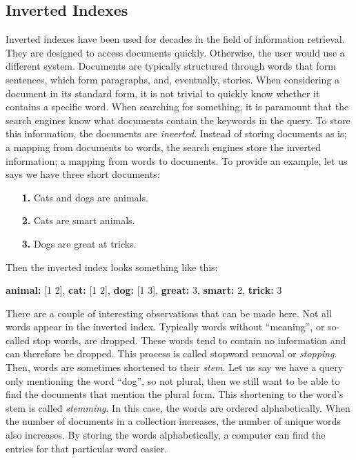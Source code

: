 \subsection{Inverted Indexes}
Inverted indexes have been used for decades in the field of information retrieval. They are designed to access documents quickly. Otherwise, the user would use a different system. Documents are typically structured through words that form sentences, which form paragraphs, and, eventually, stories. When considering a document in its standard form, it is not trivial to quickly know whether it contains a specific word. When searching for something, it is paramount that the search engines know what documents contain the keywords in the query. To store this information, the documents are \emph{inverted}. Instead of storing documents as is; a mapping from documents to words, the search engines store the inverted information; a mapping from words to documents. To provide an example, let us says we have three short documents:

\begin{itemize}
	\item[\textbf{1.}] Cats and dogs are animals.
	\item[\textbf{2.}] Cats are smart animals.
	\item[\textbf{3.}] Dogs are great at tricks. 
\end{itemize}
Then the inverted index looks something like this:

\medskip
\textbf{animal:} [1 2],
\textbf{cat:} [1 2], 
\textbf{dog:} [1 3],
\textbf{great:} 3,
\textbf{smart:} 2,
\textbf{trick:} 3
\medskip

\noindent There are a couple of interesting observations that can be made here. Not all words appear in the inverted index. Typically words without ``meaning'', or so-called stop words, are dropped. These words tend to contain no information and can therefore be dropped. This process is called stopword removal or \emph{stopping}. Then, words are sometimes shortened to their \emph{stem}. Let us say we have a query only mentioning the word ``dog'', so not plural, then we still want to be able to find the documents that mention the plural form. This shortening to the word's stem is called \emph{stemming}. In this case, the words are ordered alphabetically. When the number of documents in a collection increases, the number of unique words also increases. By storing the words alphabetically, a computer can find the entries for that particular word easier. 

